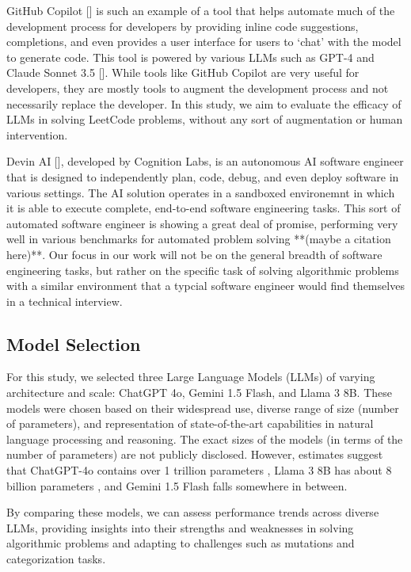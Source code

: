 \documentclass[times, 10pt,twocolumn]{article}
\begin{document}
GitHub Copilot [] is such an example of a tool that helps automate much of the development process for developers by providing inline code suggestions, completions, and even provides a user interface for users to `chat' with the model to generate code. This tool is powered by various LLMs such as GPT-4 and Claude Sonnet 3.5 []. While tools like GitHub Copilot are very useful for developers, they are mostly tools to augment the development process and not necessarily replace the developer. In this study, we aim to evaluate the efficacy of LLMs in solving LeetCode problems, without any sort of augmentation or human intervention.

Devin AI [], developed by Cognition Labs, is an autonomous AI software engineer that is designed to independently plan, code, debug, and even deploy software in various settings. The AI solution operates in a sandboxed environemnt in which it is able to execute complete, end-to-end software engineering tasks. This sort of automated software engineer is showing a great deal of promise, performing very well in various benchmarks for automated problem solving **(maybe a citation here)**. Our focus in our work will not be on the general breadth of software engineering tasks, but rather on the specific task of solving algorithmic problems with a similar environment that a typcial software engineer would find themselves in a technical interview. 


\subsection{Model Selection}

For this study, we selected three Large Language Models (LLMs) of varying architecture and scale: ChatGPT 4o, Gemini 1.5 Flash, and Llama 3 8B. These models were chosen based on their widespread use, diverse range of size (number of parameters), and representation of state-of-the-art capabilities in natural language processing and reasoning. The exact sizes of the models (in terms of the number of parameters) are not publicly disclosed. However, estimates suggest that ChatGPT-4o contains over 1 trillion parameters \cite{Lacy_2024}, Llama 3 8B has about 8 billion parameters \cite{AIatMeta_2024}, and Gemini 1.5 Flash falls somewhere in between.

By comparing these models, we can assess performance trends across diverse LLMs, providing insights into their strengths and weaknesses in solving algorithmic problems and adapting to challenges such as mutations and categorization tasks.
\end{document}
